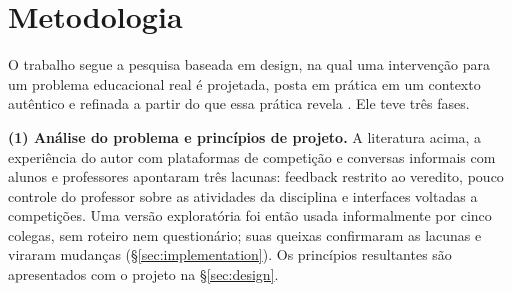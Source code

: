 \documentclass[12pt]{article}
\begin{document}
\begin{table}[ht]
\centering
\scriptsize
\setlength{\tabcolsep}{3pt}
\caption{Comparação do WhyRunner com ferramentas relacionadas, conforme descritas nas fontes citadas. n/r: não relatado nessas fontes; ---: não se aplica.}
\label{tab:judge-comparison}
\end{table}

\section{Metodologia}\label{sec:methodology}

O trabalho segue a pesquisa baseada em design, na qual uma intervenção para um problema educacional real é projetada, posta em prática em um contexto autêntico e refinada a partir do que essa prática revela \cite{wang2005dbr}. Ele teve três fases.

\textbf{(1) Análise do problema e princípios de projeto.} A literatura acima, a experiência do autor com plataformas de competição e conversas informais com alunos e professores apontaram três lacunas: feedback restrito ao veredito, pouco controle do professor sobre as atividades da disciplina e interfaces voltadas a competições. Uma versão exploratória foi então usada informalmente por cinco colegas, sem roteiro nem questionário; suas queixas confirmaram as lacunas e viraram mudanças (\S\ref{sec:implementation}). Os princípios resultantes são apresentados com o projeto na \S\ref{sec:design}.
\end{document}
